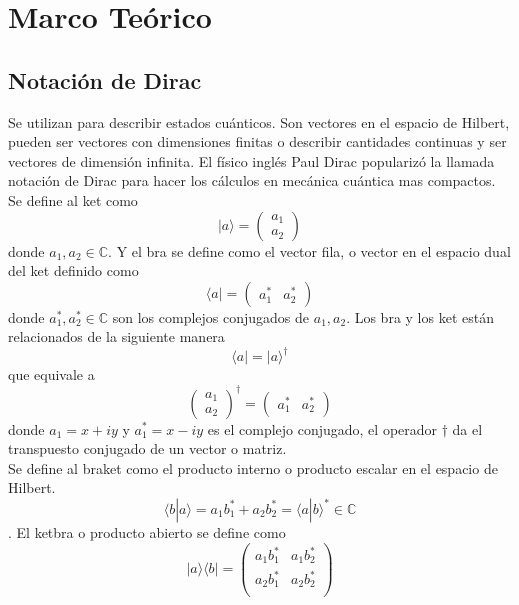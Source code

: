\documentclass[a4paper]{article}
\begin{document}
\section{Marco Teórico}
\subsection{Notación de Dirac}
Se utilizan para describir estados cuánticos. Son vectores en el espacio de Hilbert, pueden ser vectores con dimensiones finitas o describir cantidades continuas y ser vectores de dimensión infinita. El físico inglés Paul Dirac popularizó la llamada notación de Dirac para hacer los cálculos en mecánica cuántica mas compactos.
Se define al ket como
\begin{equation}
|a\rangle=
	\begin{pmatrix}
		a_1\\
		a_2
	\end{pmatrix}
\end{equation}
donde $a_1, a_2 \in \mathbb{C} $. Y el bra se define como el vector fila, o vector en el espacio dual del ket definido como 
\begin{equation}
\langle a|=
	\begin{pmatrix}
		a_1^*&a_2^*
	\end{pmatrix}
\end{equation}
donde $a_1^*, a_2^* \in \mathbb{C} $ son los complejos conjugados de $a_1, a_2$.
Los bra y los ket están relacionados de la siguiente manera
\begin{equation}
\langle a|=|a\rangle^\dagger
\end{equation}
que equivale a 
\begin{equation}
\begin{pmatrix}
		a_1\\
		a_2
	\end{pmatrix}^\dagger=
	\begin{pmatrix}
		a_1^*&a_2^*
	\end{pmatrix}
\end{equation}
donde $a_1=x+iy$ y $a_1^*=x-iy$ es el complejo conjugado, el operador $\dagger$ da el transpuesto conjugado de un vector o matriz.\\
Se define al braket como el producto interno o producto escalar en el espacio de Hilbert.
\begin{equation}
\langle b | a\rangle=a_1b_1^*+a_2b_2^*=\langle a | b\rangle^*\in \mathbb{C}
\end{equation}.
El ketbra o producto abierto se define como 
\begin{equation}
|a\rangle\langle b|=
	\begin{pmatrix}
		a_1 b_1^*& a_1 b_2^*\\
		a_2 b_1^*& a_2 b_2^*\\
	\end{pmatrix}
\end{equation}
\end{document}
